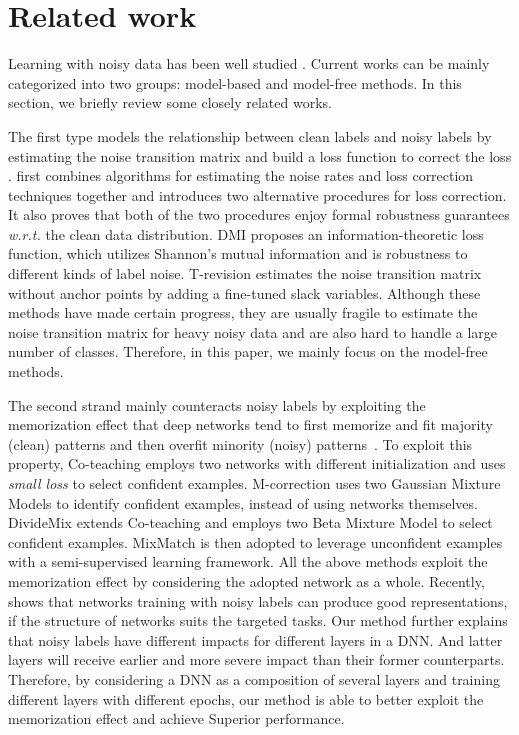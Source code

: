\documentclass[11pt]{article}
\begin{document}
\section{Related work}
\label{sec:rel}
Learning with noisy data has been well studied \cite{liu2016reweighting, Goldberger17AdaptLayer, Ma18Dimensionality, Wang2019Symmetric, Ma2020NormalizedLoss, xia2021robust}. Current works can be mainly categorized into two groups: model-based and model-free methods. In this section, we briefly review some closely related works. 


The first type models the relationship between clean labels and noisy labels by estimating the noise transition matrix and build a loss function to correct the loss \cite{Patrini2017forward, xia2020parts, Yao2020Dual, wu2020class2simi}. \cite{Patrini2017forward} first combines algorithms for estimating the noise rates and loss correction techniques together and introduces two alternative procedures for loss correction. It also proves that both of the two procedures enjoy formal robustness guarantees \emph{w.r.t.} the clean data distribution. DMI \cite{Xu2019DMI} proposes an information-theoretic loss function, which utilizes Shannon’s mutual information and is robustness to different kinds of label noise. T-revision \cite{xia2019anchor} estimates the noise transition matrix without anchor points by adding a fine-tuned slack variables. Although these methods have made certain progress, they are usually fragile to estimate the noise transition matrix for heavy noisy data and are also hard to handle a large number of classes. Therefore, in this paper, we mainly focus on the model-free methods.

The second strand mainly counteracts noisy labels by exploiting the memorization effect that deep networks tend to first memorize and fit majority (clean) patterns and then overfit minority (noisy) patterns~\cite{Arpit2017Look}. To exploit this property,  Co-teaching \cite{han2018co} employs two networks with different initialization and uses \textit{small loss} to select confident examples.  M-correction \cite{Arazo2019UnsupervisedLabel} uses two Gaussian Mixture Models to identify confident examples, instead of using networks themselves. DivideMix \cite{Li2020DivideMix} extends Co-teaching \cite{han2018co} and employs two Beta Mixture Model to select confident examples. MixMatch \cite{Berthelot2019MixMatch} is then adopted to  leverage unconfident examples with a semi-supervised learning framework. All the above methods exploit the memorization effect by considering the adopted network as a whole. Recently, \cite{Jimmy2020GoodRepr} shows that networks training with noisy labels can produce good representations, if the structure of networks suits the targeted tasks. Our method further explains that noisy labels have different impacts for different layers in a DNN. And latter layers will receive earlier and more severe impact than their former counterparts. Therefore, by considering a DNN as a composition of several layers and training different layers with different epochs, our method is able to better exploit the memorization effect and achieve Superior performance. 
\end{document}
